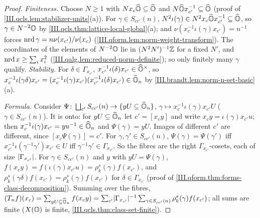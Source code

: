 \begin{lemma}
\end{lemma}
\begin{proof}
\emph{Finiteness.} Choose $N\ge1$ with $Nx_c\widehat{\mathbb{O}}\subseteq\widehat{\mathbb{O}}$ and $N\widehat{\mathbb{O}} x_{c'}^{-1}\subseteq\widehat{\mathbb{O}}$ (proof of \cref{III.qcls.lem:stabilizer-units}(a)). For
$\gamma\in S_{cc'}(n)$, $N^2\iota(\gamma)\in N^2x_c\widehat{\mathbb{O}} x_{c'}^{-1}\subseteq\widehat{\mathbb{O}}$, so $\gamma\in N^{-2}\mathbb{O}$ by \cref{III.qcls.thm:lattice-local-global}(a);
and $\nu(x_c^{-1}\iota(\gamma)x_{c'})=n^{-1}$ forces $\operatorname{nrd}\gamma=n\nu(x_{c'})/\nu(x_c)$ (\cref{III.qform.lem:norm-weight-transform}). The coordinates of the
elements of $N^{-2}\mathbb{O}$ lie in $(N^2N')^{-1}\mathbb{Z}$ for a fixed $N'$, and $\operatorname{nrd} x\ge\sum_ix_i^2$ (\cref{III.qalg.lem:reduced-norm-definite}); so only finitely
many $\gamma$ qualify. \emph{Stability.} For $\delta\in\Gamma_{x_{c'}}$, $x_{c'}^{-1}\iota(\delta)x_{c'}\in\widehat{\mathbb{O}}^\times$, so
$x_c^{-1}\iota(\gamma\delta)x_{c'}=(x_c^{-1}\iota(\gamma)x_{c'})(x_{c'}^{-1}\iota(\delta)x_{c'})\in\widehat{\mathbb{O}}_n$ by \cref{III.brandt.lem:norm-n-set-basic}(a).

\emph{Formula.} Consider $\Psi\colon\bigsqcup_{c'}S_{cc'}(n)\to\{yU\subseteq\widehat{\mathbb{O}}_n\}$, $\gamma\mapsto x_c^{-1}\iota(\gamma)x_{c'}U$ ($\gamma\in S_{cc'}(n)$). It is onto:
for $yU\subseteq\widehat{\mathbb{O}}_n$ let $c'=[x_cy]$ and write $x_cy=\iota(\gamma)x_{c'}u$; then $x_c^{-1}\iota(\gamma)x_{c'}=yu^{-1}\in\widehat{\mathbb{O}}_n$ and $\Psi(\gamma)=yU$. Images of
different $c'$ are different, since $[x_c\Psi(\gamma)]=c'$. For $\gamma,\gamma'\in S_{cc'}(n)$, $\Psi(\gamma)=\Psi(\gamma')$ iff
$x_{c'}^{-1}\iota(\gamma^{-1}\gamma')x_{c'}\in U$ iff $\gamma^{-1}\gamma'\in\Gamma_{x_{c'}}$. So the fibres are the right $\Gamma_{x_{c'}}$-cosets, each of size
$\lvert\Gamma_{x_{c'}}\rvert$. For $\gamma\in S_{cc'}(n)$ and $y$ with $yU=\Psi(\gamma)$, $f(x_cy)=f(\iota(\gamma)x_{c'}u)=\rho_k^s(\gamma)f(x_{c'})$, and
$\rho_k^s(\gamma\delta)f(x_{c'})=\rho_k^s(\gamma)f(x_{c'})$ for $\delta\in\Gamma_{x_{c'}}$ (proof of \cref{III.qform.thm:forms-class-decomposition}). Summing over
the fibres, $(T_nf)(x_c)=\sum_{yU\subseteq\widehat{\mathbb{O}}_n}f(x_cy)=\sum_{c'}\lvert\Gamma_{x_{c'}}\rvert^{-1}\sum_{\gamma\in S_{cc'}(n)}\rho_k^s(\gamma)f(x_{c'})$; all sums
are finite ($X(\mathbb{O})$ is finite, \cref{III.qcls.thm:class-set-finite}).
\end{proof}

